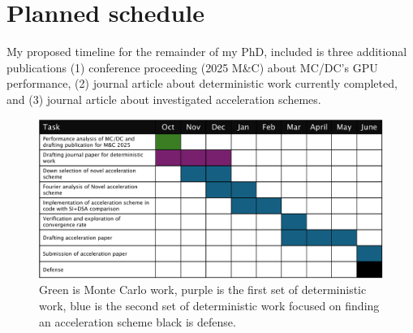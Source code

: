 
\chapter{Planned schedule} 
\label{ch-schedule}

My proposed timeline for the remainder of my PhD, included is three additional publications (1) conference proceeding (2025 M\&C) about MC/DC's GPU performance, (2) journal article about deterministic work currently completed, and (3) journal article about investigated acceleration schemes.

\begin{figure}[ht]
    \centering
    \includegraphics[width=\textwidth]{figures/time_line.pdf}
    \caption{Green is Monte Carlo work, purple is the first set of deterministic work, blue is the second set of deterministic work focused on finding an acceleration scheme black is defense.}
    \label{fig:gantt}
\end{figure}
